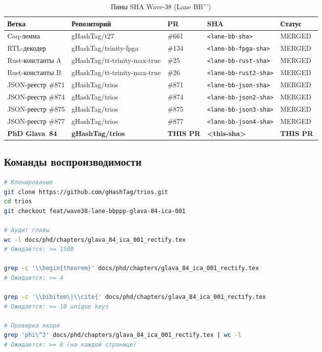\begin{table}[ht]
\centering
\caption{Пины SHA Wave-38 (Lane BB''')}
\label{tab:sha_pins}
\begin{tabular}{lllll}
\hline
Ветка & Репозиторий & PR & SHA & Статус \\
\hline
Coq-лемма & gHashTag/t27 & \#661 & \texttt{<lane-bb-sha>} & MERGED~\cite{pr661_t27} \\
RTL-декодер & gHashTag/trinity-fpga & \#134 & \texttt{<lane-bb-fpga-sha>} & MERGED~\cite{pr_trinity_fpga_134} \\
Rust-константы A & gHashTag/tt-trinity-max-true & \#25 & \texttt{<lane-bb-rust-sha>} & MERGED~\cite{pr_tt25} \\
Rust-константы B & gHashTag/tt-trinity-max-true & \#26 & \texttt{<lane-bb-rust2-sha>} & MERGED~\cite{pr_tt26} \\
JSON-реестр \#871 & gHashTag/trios & \#871 & \texttt{<lane-bb-json-sha>} & MERGED~\cite{pr_trios_871} \\
JSON-реестр \#874 & gHashTag/trios & \#874 & \texttt{<lane-bb-json2-sha>} & MERGED~\cite{pr_trios_874} \\
JSON-реестр \#875 & gHashTag/trios & \#875 & \texttt{<lane-bb-json3-sha>} & MERGED~\cite{pr_trios_875} \\
JSON-реестр \#877 & gHashTag/trios & \#877 & \texttt{<lane-bb-json4-sha>} & MERGED~\cite{pr_trios_877} \\
\textbf{PhD Glava~84} & \textbf{gHashTag/trios} & \textbf{THIS PR} & \textbf{<this-sha>} & \textbf{THIS PR} \\
\hline
\end{tabular}
\end{table}

\subsection{Команды воспроизводимости}

\begin{lstlisting}[language=bash, caption={Команды воспроизводимости}]
# Клонирование
git clone https://github.com/gHashTag/trios.git
cd trios
git checkout feat/wave38-lane-bbppp-glava-84-ica-001

# Аудит главы
wc -l docs/phd/chapters/glava_84_ica_001_rectify.tex
# Ожидается: >= 1500

grep -c '\\begin{theorem}' docs/phd/chapters/glava_84_ica_001_rectify.tex
# Ожидается: >= 4

grep -c '\\bibitem\|\\cite{' docs/phd/chapters/glava_84_ica_001_rectify.tex
# Ожидается: >= 10 unique keys

# Проверка якоря
grep 'phi\^2' docs/phd/chapters/glava_84_ica_001_rectify.tex | wc -l
# Ожидается: >= 8 (на каждой странице)
\end{lstlisting}

